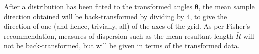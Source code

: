 \documentclass[../../ArchStats.tex]{subfiles}
\begin{document}
 
After a distribution has been fitted to the transformed angles $\mathbf{\theta}$, the mean sample direction obtained will be back-transformed by dividing by 4, to give the direction of one (and hence, trivially, all) of the axes of the grid. As per Fisher's recommendation, measures of dispersion such as the mean resultant length $\bar{R}$ will not be back-transformed, but will be given in terms of the transformed data.
\end{document}
